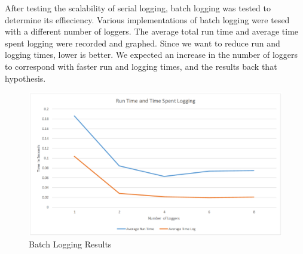 After testing the scalability of serial logging, batch logging was tested to determine its effieciency. Various implementations of batch logging were tesed with a different number of loggers. The average total run time and average time spent logging were recorded and graphed. Since we want to reduce run and logging times, lower is better. We expected an increase in the number of loggers to correspond with faster run and logging times, and the results back that hypothesis.
\begin{figure}
	\caption{Batch Logging Results}
	\includegraphics[width=\textwidth]{BatchLoggingResults.png}
\end{figure}
